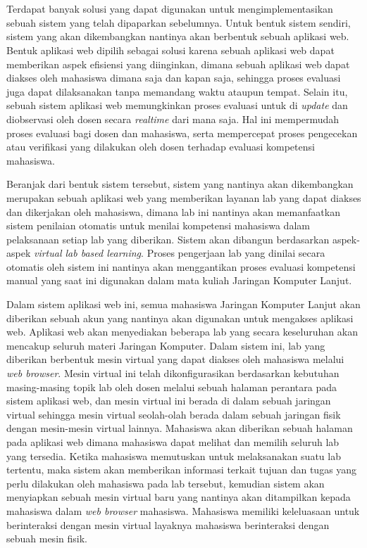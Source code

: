 \chapter{\babDua}
\label{bab:2}
Terdapat banyak solusi yang dapat digunakan untuk mengimplementasikan sebuah sistem yang telah dipaparkan sebelumnya. Untuk bentuk sistem sendiri,
sistem yang akan dikembangkan nantinya akan berbentuk sebuah aplikasi web. Bentuk aplikasi web dipilih sebagai solusi karena sebuah aplikasi web dapat 
memberikan aspek efisiensi yang diinginkan, dimana sebuah aplikasi web dapat diakses oleh mahasiswa dimana saja dan kapan saja, sehingga proses
evaluasi juga dapat dilaksanakan tanpa memandang waktu ataupun tempat. Selain itu, sebuah sistem aplikasi web memungkinkan proses evaluasi untuk
di \textit{update} dan diobservasi oleh dosen secara \textit{realtime} dari mana saja. Hal ini mempermudah proses evaluasi bagi dosen dan mahasiswa, 
serta mempercepat proses pengecekan atau verifikasi yang dilakukan oleh dosen terhadap evaluasi kompetensi mahasiswa.
\par

Beranjak dari bentuk sistem tersebut, sistem yang nantinya akan dikembangkan merupakan sebuah aplikasi web yang memberikan layanan lab yang dapat 
diakses dan dikerjakan oleh mahasiswa, dimana lab ini nantinya akan memanfaatkan sistem penilaian otomatis untuk menilai kompetensi mahasiswa dalam 
pelaksanaan setiap lab yang diberikan. Sistem akan dibangun berdasarkan aspek-aspek \textit{virtual lab based learning}. Proses pengerjaan lab yang 
dinilai secara otomatis oleh sistem ini nantinya akan menggantikan proses evaluasi kompetensi manual yang saat ini digunakan dalam mata kuliah Jaringan Komputer Lanjut.
\par

Dalam sistem aplikasi web ini, semua mahasiswa Jaringan Komputer Lanjut akan diberikan sebuah akun yang nantinya akan digunakan untuk mengakses aplikasi web.
Aplikasi web akan menyediakan beberapa lab yang secara keseluruhan akan mencakup seluruh materi Jaringan Komputer. Dalam sistem ini, lab yang diberikan berbentuk
mesin virtual yang dapat diakses oleh mahasiswa melalui \textit{web browser}. Mesin virtual ini telah dikonfigurasikan berdasarkan kebutuhan masing-masing topik lab
oleh dosen melalui sebuah halaman perantara pada sistem aplikasi web, dan mesin virtual ini berada di dalam sebuah jaringan virtual sehingga mesin virtual
seolah-olah berada dalam sebuah jaringan fisik dengan mesin-mesin virtual lainnya. Mahasiswa akan diberikan sebuah halaman pada aplikasi web dimana mahasiswa dapat melihat
dan memilih seluruh lab yang tersedia. Ketika mahasiswa memutuskan untuk melaksanakan suatu lab tertentu, maka sistem akan memberikan informasi terkait tujuan dan
tugas yang perlu dilakukan oleh mahasiswa pada lab tersebut, kemudian sistem akan menyiapkan sebuah mesin virtual baru yang nantinya akan ditampilkan kepada
mahasiswa dalam \textit{web browser} mahasiswa. Mahasiswa memiliki keleluasaan untuk berinteraksi dengan mesin virtual layaknya mahasiswa berinteraksi dengan sebuah mesin fisik. 
\par

